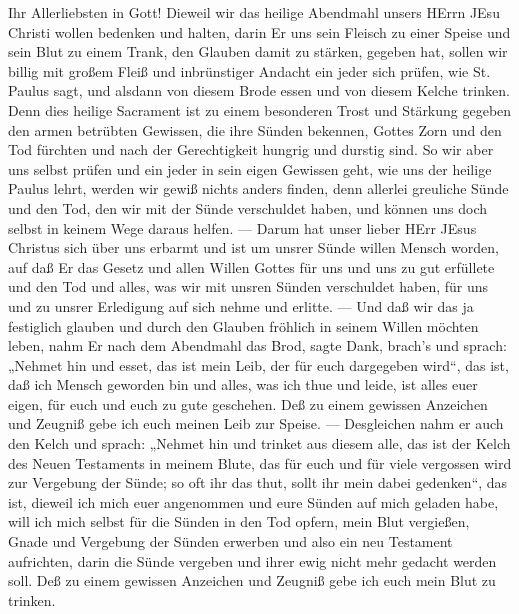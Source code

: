 Ihr Allerliebsten in Gott! Dieweil wir das heilige Abendmahl unsers HErrn JEsu Christi wollen bedenken und halten, darin Er uns sein Fleisch zu einer Speise und sein Blut zu einem Trank, den Glauben damit zu stärken, gegeben hat, sollen wir billig mit großem Fleiß und inbrünstiger Andacht ein jeder sich prüfen, wie St. Paulus sagt, und alsdann von diesem Brode essen und von diesem Kelche trinken. Denn dies heilige Sacrament ist zu einem besonderen Trost und Stärkung gegeben den armen betrübten Gewissen, die ihre Sünden bekennen, Gottes Zorn und den Tod fürchten und nach der Gerechtigkeit hungrig und durstig sind. So wir aber uns selbst prüfen und ein jeder in sein eigen Gewissen geht, wie uns der heilige Paulus lehrt, werden wir gewiß nichts anders finden, denn allerlei greuliche Sünde und den Tod, den wir mit der Sünde verschuldet haben, und können uns doch selbst in keinem Wege daraus helfen. — Darum hat unser lieber HErr JEsus Christus sich über uns erbarmt und ist um unsrer Sünde willen Mensch worden, auf daß Er das Gesetz und allen Willen Gottes für uns und uns zu gut erfüllete und den Tod und alles, was wir mit unsren Sünden verschuldet haben, für uns und zu unsrer Erledigung auf sich nehme und erlitte. — Und daß wir das ja festiglich glauben und durch den Glauben fröhlich in seinem Willen möchten leben, nahm Er nach dem Abendmahl das Brod, sagte Dank, brach’s und sprach: „Nehmet hin und esset, das ist mein Leib, der für euch dargegeben wird“, das ist, daß ich Mensch geworden bin und alles, was ich thue und leide, ist alles euer eigen, für euch und euch zu gute geschehen. Deß zu einem gewissen Anzeichen und Zeugniß gebe ich euch meinen Leib zur Speise. — Desgleichen nahm er auch den Kelch und sprach: „Nehmet hin und trinket aus diesem alle, das ist der Kelch des Neuen Testaments in meinem Blute, das für euch und für viele vergossen wird zur Vergebung der Sünde; so oft ihr das thut, sollt ihr mein dabei gedenken“, das ist, dieweil ich mich euer angenommen und eure Sünden auf mich geladen habe, will ich mich selbst für die Sünden in den Tod opfern, mein
Blut vergießen, Gnade und Vergebung der Sünden erwerben und also ein neu Testament aufrichten, darin die Sünde vergeben und ihrer ewig nicht mehr gedacht werden soll. Deß zu einem gewissen Anzeichen und Zeugniß gebe ich euch mein Blut zu trinken.

